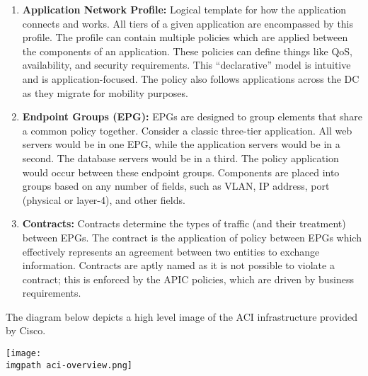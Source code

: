 \begin{enumerate}
  \item \textbf{Application Network Profile:} Logical template for how the
  application connects and works. All tiers of a given application are
  encompassed by this profile. The profile can contain multiple policies which
  are applied between the components of an application. These policies can
  define things like QoS, availability, and security requirements. This
  ``declarative'' model is intuitive and is application-focused. The policy
  also follows applications across the DC as they migrate for mobility purposes.
  \item \textbf{Endpoint Groups (EPG):} EPGs are designed to group elements
  that share a common policy together. Consider a classic three-tier
  application. All web servers would be in one EPG, while the application
  servers would be in a second. The database servers would be in a third. The
  policy application would occur between these endpoint groups. Components are
  placed into groups based on any number of fields, such as VLAN, IP address,
  port (physical or layer-4), and other fields.
  \item \textbf{Contracts:} Contracts determine the types of traffic (and
  their treatment) between EPGs. The contract is the application of policy
  between EPGs which effectively represents an agreement between two entities
  to exchange information. Contracts are aptly named as it is not possible to
  violate a contract; this is enforced by the APIC policies, which are driven
  by business requirements.
\end{enumerate}

The diagram below depicts a high level image of the ACI infrastructure provided by Cisco.

    \begin{minipage}[t]{\linewidth}
	  \centering
      \texttt{[image: \\imgpath aci-overview.png]}
    \end{minipage}
